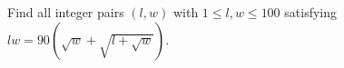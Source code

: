 Find all integer pairs $(l,w)$ with $1\le l,w\le100$ satisfying $lw=90\left(\sqrt w+\sqrt{l+\sqrt w}\right)$.
